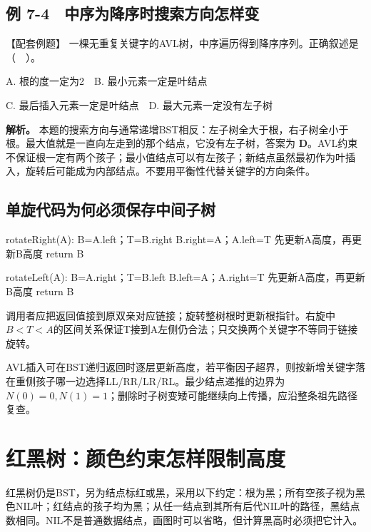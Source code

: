 \subsection{例 7-4　中序为降序时搜索方向怎样变}\label{DS07-ex4}

\begin{example}[配套案例]

【配套例题】 一棵无重复关键字的AVL树，中序遍历得到降序序列。正确叙述是（　）。

A. 根的度一定为2　B. 最小元素一定是叶结点

C. 最后插入元素一定是叶结点　D. 最大元素一定没有左子树

\end{example}

\textbf{解析。} 本题的搜索方向与通常递增BST相反：左子树全大于根，右子树全小于根。最大值就是一直向左走到的那个结点，它没有左子树，答案为 \textbf{D}。AVL约束不保证根一定有两个孩子；最小值结点可以有左孩子；新结点虽然最初作为叶插入，旋转后可能成为内部结点。不要用平衡性代替关键字的方向条件。

\subsection{单旋代码为何必须保存中间子树}\label{DS07-rotate-code}

\begin{codeblock}[language={}]
rotateRight(A):
    B=A.left；T=B.right
    B.right=A；A.left=T
    先更新A高度，再更新B高度
    return B

rotateLeft(A):
    B=A.right；T=B.left
    B.left=A；A.right=T
    先更新A高度，再更新B高度
    return B
\end{codeblock}

调用者应把返回值接到原双亲对应链接；旋转整树根时更新根指针。右旋中\(B<T<A\)的区间关系保证T接到A左侧仍合法；只交换两个关键字不等同于链接旋转。

AVL插入可在BST递归返回时逐层更新高度，若平衡因子超界，则按新增关键字落在重侧孩子哪一边选择LL/RR/LR/RL。最少结点递推的边界为\(N(0)=0,N(1)=1\)；删除时子树变矮可能继续向上传播，应沿整条祖先路径复查。

\section{红黑树：颜色约束怎样限制高度}\label{DS07-06}

红黑树仍是BST，另为结点标红或黑，采用以下约定：根为黑；所有空孩子视为黑色NIL叶；红结点的孩子均为黑；从任一结点到其所有后代NIL叶的路径，黑结点数相同。NIL不是普通数据结点，画图时可以省略，但计算黑高时必须把它计入。

